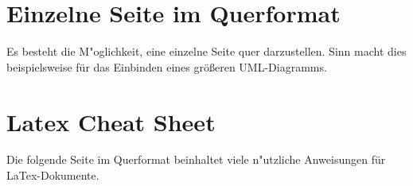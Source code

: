\begin{landscape}


\section{Einzelne Seite im Querformat}
\label{sec:Querformat}

Es besteht die M"oglichkeit, eine einzelne Seite quer darzustellen. Sinn macht dies beispielsweise für das Einbinden eines größeren UML-Diagramms.

\section{Latex Cheat Sheet}
\label{sec:latexCheatsheet}

Die folgende Seite im Querformat beinhaltet viele n"utzliche Anweisungen für LaTex-Dokumente.

\end{landscape}

 



\cleardoublepage

